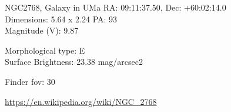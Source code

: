 \begin{block}{NGC2768, Galaxy in UMa}
    RA: 09:11:37.50, Dec: +60:02:14.0 \\ 
    Dimensions: 5.64 x 2.24 PA: 93 \\ 
    Magnitude (V): 9.87

    Morphological type: E \\ 
    Surface Brightness: 23.38 mag/arcsec2 


    Finder fov: 30 

    \url{https://en.wikipedia.org/wiki/NGC_2768} 
\end{block}